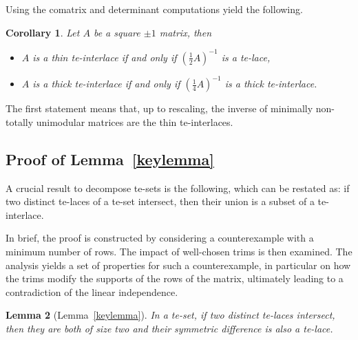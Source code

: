 \documentclass[11pt,a4paper]{amsart}
\theoremstyle{plain}
\newtheorem{theorem}{Theorem}[section]%
\newtheorem{corollary}[theorem]{Corollary}
\newtheorem{lemma}[theorem]{Lemma}
\theoremstyle{definition}
\begin{document}
Using the comatrix and determinant computations yield the following.
\begin{corollary}
Let $A$ be a square $\pm1$ matrix, then
\begin{itemize}
\item $A$ is a thin te-interlace if and only if $\left(\frac{1}{2}A\right)^{-1}$ is a te-lace,
\item $A$ is a thick te-interlace if and only if $\left(\frac{1}{4}A\right)^{-1}$ is a thick te-interlace.
\end{itemize}
\end{corollary}
The first statement means that, up to rescaling, the inverse of minimally non-totally unimodular matrices are the thin te-interlaces.
%


\subsection{Proof of Lemma~\ref{keylemma}}

A crucial result to decompose te-sets is the following, which can be restated as: if two distinct te-laces of a te-set intersect, then their union is a subset of a te-interlace.

In brief, the proof is constructed by considering a counterexample with a minimum number of rows. 
The impact of well-chosen trims is then examined. 
The analysis yields a set of properties for such a counterexample, in particular on how the trims modify the supports of the rows of the matrix, ultimately leading to a contradiction of the linear independence.


\begin{lemma}[Lemma~\ref{keylemma}]\label{te-knotinter}
In a te-set, if two distinct te-laces intersect, then they are both of size two and their symmetric difference is also a te-lace.
\end{lemma}
\end{document}
